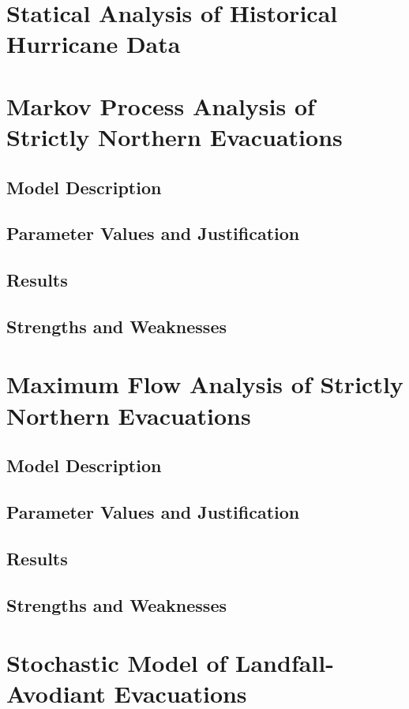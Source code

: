 \documentclass[titlepage]{article}
\begin{document}
\section{Statical Analysis of Historical Hurricane Data}
\label{sec:hurricanes}


\section{Markov Process Analysis of Strictly Northern Evacuations}
\label{sec:markov}
  \subsection{Model Description}
  \subsection{Parameter Values and Justification}
  \subsection{Results}
  \subsection{Strengths and Weaknesses}

\section{Maximum Flow Analysis of Strictly Northern Evacuations}
\label{sec:maxflow}
  \subsection{Model Description}
  \subsection{Parameter Values and Justification}
  \subsection{Results}
  \subsection{Strengths and Weaknesses}

\section{Stochastic Model of Landfall-Avodiant Evacuations}
\label{sec:stochastic}
\end{document}
